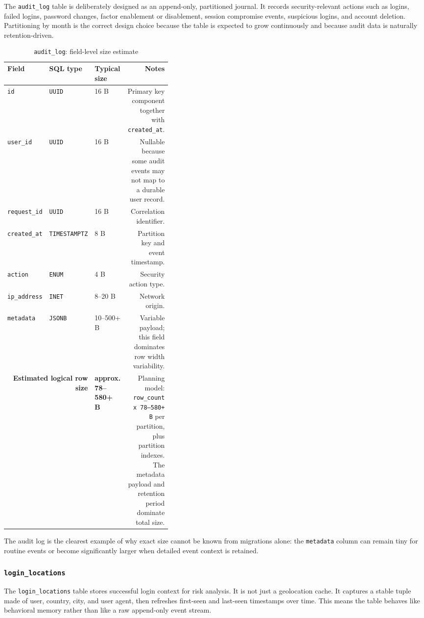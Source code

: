 \documentclass[11pt,a4paper]{article}
\newcommand{\dbfield}[4]{\texttt{#1} & \texttt{#2} & #3 & #4 \\}
\newcommand{\dbtotal}[2]{\midrule \multicolumn{2}{r}{\textbf{Estimated logical row size}} & \textbf{#1} & #2 \\}
\begin{document}
The \texttt{audit\_log} table is deliberately designed as an append-only, partitioned journal. It records security-relevant actions such as logins, failed logins, password changes, factor enablement or disablement, session compromise events, suspicious logins, and account deletion. Partitioning by month is the correct design choice because the table is expected to grow continuously and because audit data is naturally retention-driven.

\begin{table}[H]
\centering
\scriptsize
\caption{\texttt{audit\_log}: field-level size estimate}
\begin{tabularx}{\linewidth}{T{0.13\linewidth} T{0.15\linewidth} C{0.11\linewidth} N}
\toprule
Field & SQL type & Typical size & Notes \\
\midrule
\dbfield{id}{UUID}{16 B}{Primary key component together with \texttt{created\_at}.}
\dbfield{user\_id}{UUID}{16 B}{Nullable because some audit events may not map to a durable user record.}
\dbfield{request\_id}{UUID}{16 B}{Correlation identifier.}
\dbfield{created\_at}{TIMESTAMPTZ}{8 B}{Partition key and event timestamp.}
\dbfield{action}{ENUM}{4 B}{Security action type.}
\dbfield{ip\_address}{INET}{8--20 B}{Network origin.}
\dbfield{metadata}{JSONB}{10--500+ B}{Variable payload; this field dominates row width variability.}
\dbtotal{approx. 78--580+ B}{Planning model: \texttt{row\_count x 78--580+ B} per partition, plus partition indexes. The metadata payload and retention period dominate total size.}
\bottomrule
\end{tabularx}
\end{table}

The audit log is the clearest example of why exact size cannot be known from migrations alone: the \texttt{metadata} column can remain tiny for routine events or become significantly larger when detailed event context is retained.

\subsubsection{\texttt{login\_locations}}

The \texttt{login\_locations} table stores successful login context for risk analysis. It is not just a geolocation cache. It captures a stable tuple made of user, country, city, and user agent, then refreshes first-seen and last-seen timestamps over time. This means the table behaves like behavioral memory rather than like a raw append-only event stream.
\end{document}
